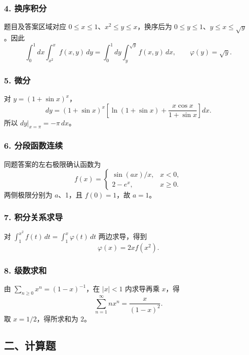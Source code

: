 \documentclass[11pt,fontset=fandol]{ctexart}
\begin{document}
\subsubsection{4. 换序积分}\label{ux6362ux5e8fux79efux5206}

题目及答案区域对应 \(0\leq x\leq1\)、\(x^2\leq y\leq x\)，换序后为
\(0\leq y\leq1\)、\(y\leq x\leq\sqrt y\)。因此 \[
\int_0^1dx\int_{x^2}^xf(x,y)\,dy
=\int_0^1dy\int_y^{\sqrt y}f(x,y)\,dx,\qquad
\boxed{\varphi(y)=\sqrt y.}
\]

\subsubsection{5. 微分}\label{ux5faeux5206}

对 \(y=(1+\sin x)^x\)， \[
dy=(1+\sin x)^x\left[\ln(1+\sin x)+\frac{x\cos x}{1+\sin x}\right]dx.
\] 所以 \(\boxed{\left.dy\right|_{x=\pi}=-\pi\,dx}\)。

\subsubsection{6.
分段函数连续}\label{ux5206ux6bb5ux51fdux6570ux8fdeux7eed}

同题答案的左右极限确认函数为 \[
f(x)=\begin{cases}\sin(ax)/x,&x<0,\\2-e^x,&x\geq0.\end{cases}
\] 两侧极限分别为 \(a\)、1，且 \(f(0)=1\)，故 \(\boxed{a=1}\)。

\subsubsection{7.
积分关系求导}\label{ux79efux5206ux5173ux7cfbux6c42ux5bfc}

对 \(\int_1^{x^2}f(t)\,dt=\int_1^x\varphi(t)\,dt\) 两边求导，得到 \[
\boxed{\varphi(x)=2xf(x^2).}
\]

\subsubsection{8. 级数求和}\label{ux7ea7ux6570ux6c42ux548c}

由 \(\sum_{n\geq0}x^n=(1-x)^{-1}\)，在 \(|x|<1\) 内求导再乘 \(x\)，得 \[
\sum_{n=1}^{\infty}nx^n=\frac{x}{(1-x)^2}.
\] 取 \(x=1/2\)，得所求和为 \(\boxed2\)。

\subsection{二、计算题}\label{ux4e8cux8ba1ux7b97ux9898}
\end{document}

